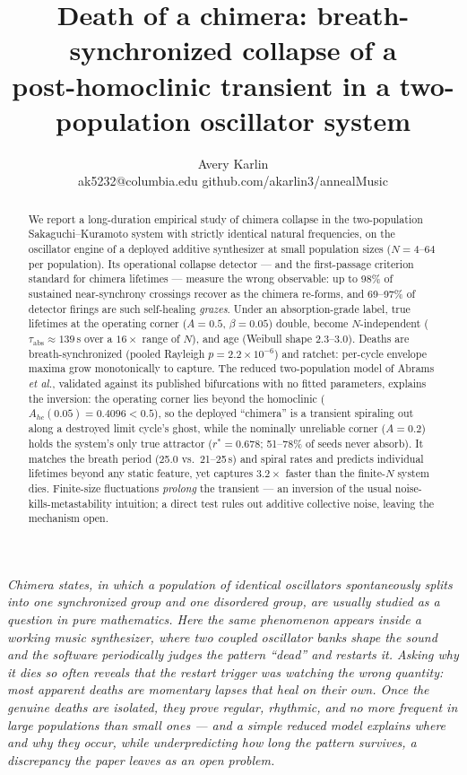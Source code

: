 \documentclass[11pt]{article}
\title{\bfseries Death of a chimera: breath-synchronized collapse of a\\ post-homoclinic transient in a two-population oscillator system}
\author{Avery Karlin\\ \small ak5232@columbia.edu \quad github.com/akarlin3/annealMusic}
\date{}
\begin{document}
\maketitle

\begin{abstract}
\noindent
We report a long-duration empirical study of chimera collapse in the two-population
Sakaguchi--Kuramoto system with strictly identical natural frequencies, on the
oscillator engine of a deployed additive synthesizer at small population sizes
($N = 4$--$64$ per population). Its operational collapse detector --- and the
first-passage criterion standard for chimera lifetimes --- measure the wrong
observable: up to 98\% of sustained near-synchrony crossings recover as the chimera
re-forms, and 69--97\% of detector firings are such self-healing \emph{grazes}.
Under an absorption-grade label, true lifetimes at the operating corner ($A = 0.5$,
$\beta = 0.05$) double, become $N$-independent ($\tau_{\mathrm{abs}} \approx 139$\,s
over a $16\times$ range of $N$), and age (Weibull shape $2.3$--$3.0$). Deaths are
breath-synchronized (pooled Rayleigh $p = 2.2\times10^{-6}$) and ratchet: per-cycle
envelope maxima grow monotonically to capture. The reduced two-population model of
Abrams \emph{et al.}, validated against its published bifurcations with no fitted
parameters, explains the inversion: the operating corner lies beyond the homoclinic
($A_{hc}(0.05) = 0.4096 < 0.5$), so the deployed ``chimera'' is a transient
spiraling out along a destroyed limit cycle's ghost, while the nominally unreliable
corner ($A = 0.2$) holds the system's only true attractor ($r^* = 0.678$; 51--78\%
of seeds never absorb). It matches the breath period (25.0 vs.\ 21--25\,s) and
spiral rates and predicts individual lifetimes beyond any static feature, yet
captures $3.2\times$ faster than the finite-$N$ system dies. Finite-size
fluctuations \emph{prolong} the transient --- an inversion of the usual
noise-kills-metastability intuition; a direct test rules out additive collective
noise, leaving the mechanism open.
\end{abstract}

\noindent\textit{Chimera states, in which a population of identical oscillators
spontaneously splits into one synchronized group and one disordered group, are
usually studied as a question in pure mathematics. Here the same phenomenon appears
inside a working music synthesizer, where two coupled oscillator banks shape the
sound and the software periodically judges the pattern ``dead'' and restarts it.
Asking why it dies so often reveals that the restart trigger was watching the wrong
quantity: most apparent deaths are momentary lapses that heal on their own. Once the
genuine deaths are isolated, they prove regular, rhythmic, and no more frequent in
large populations than small ones --- and a simple reduced model explains where and
why they occur, while underpredicting how long the pattern survives, a discrepancy
the paper leaves as an open problem.}
\end{document}
